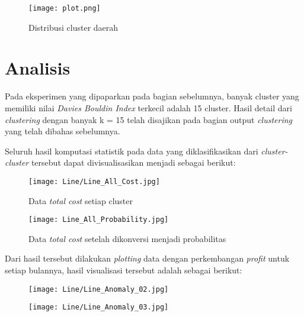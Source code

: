\documentclass{article}
\begin{document}
\begin{figure}[H]
	\texttt{[image: plot.png]}
	\caption{Distribusi cluster daerah}
\end{figure}

\section{Analisis}

Pada eksperimen yang dipaparkan pada bagian sebelumnya, banyak cluster yang memiliki nilai\textit{ Davies Bouldin Index} terkecil adalah 15 cluster. Hasil detail dari \textit{clustering} dengan banyak k = 15 telah disajikan pada bagian output \textit{clustering} yang telah dibahas sebelumnya.

Seluruh hasil komputasi statistik pada data yang diklasifikasikan dari \textit{cluster-cluster} tersebut dapat divisualisasikan menjadi sebagai berikut:

\begin{figure}[H]
	\centering
	\texttt{[image: Line/Line\_All\_Cost.jpg]}
	\caption{Data\textit{ total cost} setiap cluster}
\end{figure}

\begin{figure}[H]
	\centering
	\texttt{[image: Line\_All\_Probability.jpg]}
	\caption{Data \textit{total cost} setelah dikonversi menjadi probabilitas}
\end{figure}

Dari hasil tersebut dilakukan \textit{plotting} data dengan perkembangan \textit{profit} untuk setiap bulannya, hasil visualisasi tersebut adalah sebagai berikut:

\begin{figure}[H]
	\centering
	\begin{minipage}{.5\textwidth}
		\centering
		\texttt{[image: Line/Line\_Anomaly\_02.jpg]}
	\end{minipage}%
	\begin{minipage}{.5\textwidth}
		\centering
		\texttt{[image: Line/Line\_Anomaly\_03.jpg]}
	\end{minipage}%
\end{figure}
\end{document}
